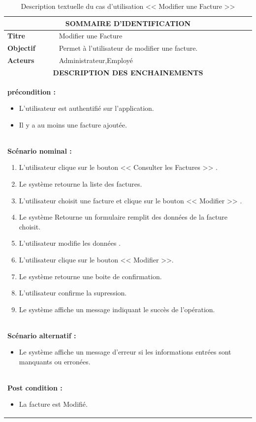 \documentclass[12pt]{report}
\begin{document}
\begin{table}[H]
\centering
\def\arraystretch{2}
\begin{tabular}{|p{2.5cm}|p{14.5cm}|}
   \hline
   \multicolumn{2}{|c|}{
   \textbf{SOMMAIRE D'IDENTIFICATION}
   } \\
   \hline
    \textbf{Titre}  &  Modifier une Facture  \\
   \hline
   \textbf{Objectif}  &  Permet à l'utilisateur de modifier une facture.  \\
   \hline
    \textbf{Acteurs}  &  Administrateur,Employé\\
   \hline
   \multicolumn{2}{|c|}{\textbf{DESCRIPTION DES ENCHAINEMENTS} } \\
   \hline
   \multicolumn{2}{|p{17cm}|}{\textbf{ précondition : }
   \begin{itemize}[label={$\bullet$}]
      \item  L'utilisateur est authentifié sur l'application. 
      \item   Il y a au moins une facture ajoutée. 
   \end{itemize}} \\
   \hline
   \multicolumn{2}{|p{17cm}|}{\textbf{ Scénario nominal : }
   \begin{enumerate}
      \item  L'utilisateur clique sur le bouton << Consulter les Factures >> .
      \item  Le système retourne la liste des factures.
      \item  L'utilisateur choisit une facture et clique sur le bouton << Modifier >> .
      \item  Le système Retourne un formulaire remplit des données de la facture choisit. 
      \item  L'utilisateur modifie les données .
      \item  L'utilisateur clique sur le bouton << Modifier >>.
      \item  Le système retourne une boite de confirmation.
      \item  L'utilisateur confirme la supression.
      \item  Le système affiche un message indiquant le succès de l'opération.
      
   \end{enumerate}} \\
   \hline
   \multicolumn{2}{|p{17cm}|}{\textbf{Scénario alternatif : }
   \begin{itemize}[label={$\bullet$}]
      \item  Le système affiche un message d'erreur si les  informations entrées sont manquants ou erronées.     
   \end{itemize}} \\
   \hline
   \multicolumn{2}{|p{17cm}|}{\textbf{ Post condition : }
   \begin{itemize}[label={$\bullet$}]
      \item  La facture est Modifié.
   \end{itemize}} \\
   \hline
\end{tabular}
\caption{Description textuelle du cas d'utilisation << Modifier une Facture >>}
\end{table}
\end{document}
